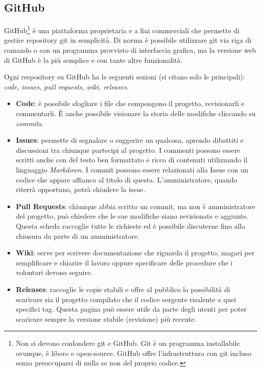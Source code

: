 \documentclass[a4paper,9pt]{extarticle}
\begin{document}
\begin{multicols*}{2}
\section{GitHub}

GitHub\footnote{Non si devono confondere git e GitHub. Git è un programma installabile
ovunque, è libero e open-source. GitHub offre l'infrastruttura con git incluso senza
preoccuparsi di nulla se non del proprio codice.} è una piattaforma proprietaria
e a fini commerciali che permette di gestire repository git in semplicità.
Di norma è possibile utilizzare git via riga di comando o con un programma provvisto
di interfaccia grafica, ma la versione web di GitHub è la più semplice e con tante
altre funzionalità.

Ogni respository su GitHub ha le seguenti sezioni (si citano solo le principali):
\textit{code, issues, pull requests, wiki, releases}.
\begin{itemize}
    \item \textbf{Code}: è possibile sfogliare i file che compongono il progetto, revisionarli e commentarli. È anche possibile visionare la storia delle modifiche cliccando su \textit{commits}.
    \item \textbf{Issues}: permette di segnalare o suggerire un qualcosa, aprendo dibattiti e discussioni tra chiunque partecipi al progetto. I commenti possono essere scritti anche con del testo ben formattato e ricco di contenuti utilizzando il linguaggio \textit{Markdown}. I commit possono essere relazionati alla Issue con un codice che appare affianco al titolo di questa. L'amministratore, quando riterrà opportuno, potrà chiudere la issue.
    \item \textbf{Pull Requests}: chiunque abbia scritto un commit, ma non è amministratore del progetto, può chiedere che le sue modifiche siano revisionate e aggiunte. Questa scheda raccoglie tutte le richieste ed è possibile discuterne fino alla chiusura da parte di un amministratore.
    \item \textbf{Wiki}: serve per scrivere documentazione che riguarda il progetto, magari per semplificare e chiarire il lavoro oppure specificare delle procedure che i volontari devono seguire.
    \item \textbf{Releases}: raccoglie le copie stabili e offre al pubblico la possibilità di scaricare sia il progetto compilato che il codice sorgente risalente a quei specifici tag. Questa pagina può essere utile da parte degli utenti per poter scaricare sempre la versione stabile (revisione) più recente.
\end{itemize}


\end{multicols*}
\end{document}

